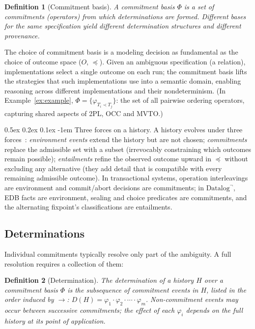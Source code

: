 \documentclass[acmsmall,review,anonymous]{acmart}
\makeatletter
\renewcommand{\paragraph}{\@startsection{paragraph}{4}{\z@}%
  {0.5ex \@plus 0.2ex \@minus 0.1ex}%
  {-1em}%
  {\normalfont\normalsize\bfseries}}
\newcommand{\Ord}{\preceq}
\newtheorem{definition}{Definition}
\theoremstyle{remark}
\numberwithin{definition}{section}
\numberwithin{theorem}{section}
\numberwithin{lemma}{section}
\numberwithin{corollary}{section}
\numberwithin{remark}{section}
\numberwithin{example}{section}
\numberwithin{observation}{section}
\numberwithin{assumption}{section}
\makeatother
\begin{document}
\begin{definition}[Commitment basis]
  \label{def:commitment-basis}
  A \emph{commitment basis} $\Phi$ is a set of commitments (operators)
  from which determinations are formed.
  Different bases for the same specification yield different determination
  structures and different provenance.
\end{definition}

\noindent
The choice of commitment basis is a modeling decision as fundamental as
the choice of outcome space ($O$, $\Ord$).
Given an ambiguous specification (a relation), implementations select a
single outcome on each run; the commitment basis lifts the strategies
that such implementations use into a semantic domain, enabling
reasoning across different implementations and their nondeterminism.
(In Example~\ref{ex:example}, $\Phi = \{\varphi_{T_i \prec T_j}\}$:
the set of all pairwise ordering operators, capturing shared
aspects of 2PL, OCC and MVTO.)

\paragraph{Three forces on a history.}
\label{sec:three-forces}%
A history evolves under three
forces~\cite{anon2026complexity}:
\emph{environment events} extend the history but are not chosen;
\emph{commitments} replace the admissible set with a subset
(irrevocably constraining which outcomes remain possible);
\emph{entailments} refine the observed outcome upward in $\Ord$
without excluding any alternative (they add detail that is compatible
with every remaining admissible outcome).
In transactional systems, operation interleavings are environment and
commit/abort decisions are commitments; in $\mbox{Datalog}^\neg$, EDB
facts are environment, sealing and choice predicates are commitments,
and the alternating fixpoint's classifications are entailments.

\subsection{Determinations}

Individual commitments typically resolve only part of the ambiguity.
A full resolution requires a collection of them:

\begin{definition}[Determination]
  \label{def:determination}%
  The \emph{determination} of a history $H$ over a commitment basis
  $\Phi$ is the subsequence of commitment events in $H$, listed in the
  order induced by $\rightarrow$:
  $D(H) = \varphi_1 \cdot \varphi_2 \cdot \cdots \cdot \varphi_m$.
  Non-commitment events may occur between successive commitments; the
  effect of each $\varphi_i$ depends on the full history at its point
  of application.
\end{definition}
\end{document}

